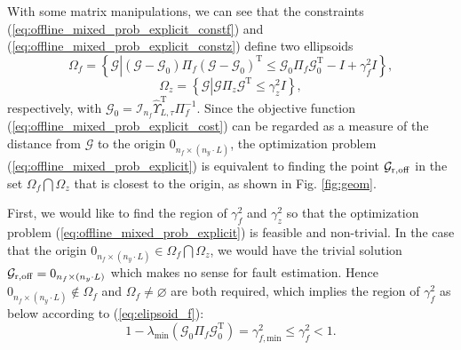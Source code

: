 \documentclass[twocolumn]{autart}
\begin{document}
With some matrix manipulations,
we can see that the constraints (\ref{eq:offline_mixed_prob_explicit_constf}) and (\ref{eq:offline_mixed_prob_explicit_constz}) define two ellipsoids
\begin{equation}\label{eq:elipsoid_f}
\Omega_f = \left\{
\mathcal{G} \left| \left( \mathcal{G} - \mathcal{G}_0 \right) \Pi_f \left( \mathcal{G} - \mathcal{G}_0 \right)^\mathrm{T}
\leq \mathcal{G}_0 \Pi_f \mathcal{G}_0^\mathrm{T} - I + \gamma_f^2 I \right.
\right\},
\end{equation}
\begin{equation}
\Omega_z = \left\{ \mathcal{G} \left| \mathcal{G} \Pi_z \mathcal{G}^\mathrm{T} \leq \gamma_z^2 I \right. \right\},
\end{equation}
respectively, with $\mathcal{G}_0 = \mathcal{I}_{n_f} \hat {\Upsilon}_{L,\tau}^\mathrm{T} \Pi_f^{-1}$.
Since the objective function (\ref{eq:offline_mixed_prob_explicit_cost})
can be regarded as a measure of the distance from $\mathcal{G}$ to
the origin $0_{n_f \times \left(n_y \cdot L \right)}$, the optimization problem (\ref{eq:offline_mixed_prob_explicit}) is equivalent to finding the point $\mathcal{G}_{\rm{r,off}}$ in the set
$\Omega_f \bigcap \Omega_z$ that is closest to the origin, as shown in Fig. \ref{fig:geom}.


First, we would like to find the region of $\gamma_f^2$ and $\gamma_z^2$ so that the optimization problem (\ref{eq:offline_mixed_prob_explicit}) is feasible and non-trivial. In the case that the origin $0_{n_f \times \left(n_y \cdot L \right)} \in \Omega_f \bigcap \Omega_z$, we would have the trivial solution $\mathcal{G}_{\rm{r,off}} = 0_{n_f \times \left(n_y \cdot L \right)}$ which makes no sense for fault estimation. Hence
$0_{n_f \times \left(n_y \cdot L \right)} \notin \Omega_f$ and $\Omega_f \neq \varnothing$ are both required, which implies the region of $\gamma_f^2$ as below according to (\ref{eq:elipsoid_f}):
\begin{equation}\label{eq:gammaf_range}
1- \lambda_{\mathrm{min}} \left( \mathcal{G}_0 \Pi_f \mathcal{G}_0^\mathrm{T} \right) = \gamma_{f,\text{min}}^2 \leq \gamma_f^2 < 1.
\end{equation}
\end{document}
